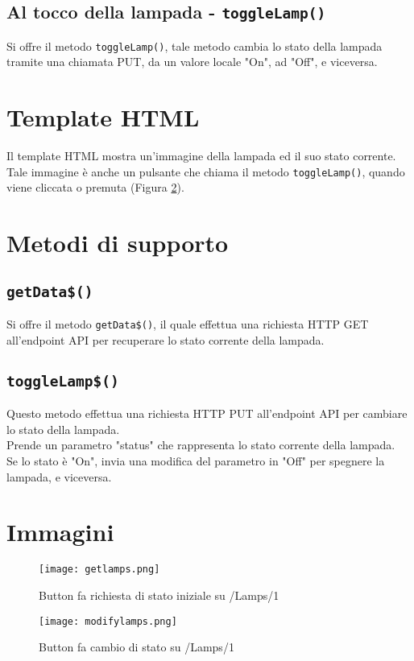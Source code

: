 \subsection{Al tocco della lampada - \texttt{toggleLamp()}}

Si offre il metodo \texttt{toggleLamp()}, tale metodo cambia lo stato della lampada tramite una chiamata PUT, da un valore locale "On", ad "Off", e viceversa.

\section{Template HTML}
Il template HTML mostra un'immagine della lampada ed il suo stato corrente. \\
Tale immagine è anche un pulsante che chiama il metodo \texttt{toggleLamp()}, quando viene cliccata o premuta (Figura \ref{fig:modifylamps}).

\section{Metodi di supporto}

\subsection{\texttt{getData\$()}}
Si offre il metodo \texttt{getData\$()}, il quale effettua una richiesta HTTP GET all'endpoint API per recuperare lo stato corrente della lampada.

\subsection{\texttt{toggleLamp\$()}}
Questo metodo effettua una richiesta HTTP PUT all'endpoint API per cambiare lo stato della lampada. \\
Prende un parametro "status" che rappresenta lo stato corrente della lampada. \\
Se lo stato è "On", invia una modifica del parametro in "Off" per spegnere la lampada, e viceversa.

\section{Immagini}

\begin{figure}[H]
    \centering
    \texttt{[image: getlamps.png]}
    \caption{Button fa richiesta di stato iniziale su /Lamps/1}
    \label{fig:getlamps}
\end{figure}


\begin{figure}[H]
    \centering
    \texttt{[image: modifylamps.png]}
    \caption{Button fa cambio di stato su /Lamps/1}
    \label{fig:modifylamps}
\end{figure}